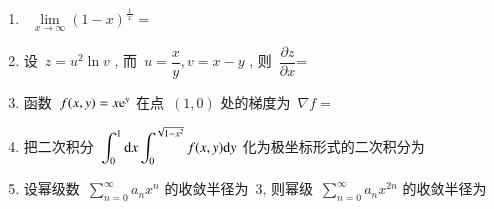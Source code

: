 \documentclass[twocolumn,landscape,fntef,UTF8]{ctexart}
\begin{document}
\begin{enumerate}%
\item ~$\lim\limits_{x\rightarrow \infty}(1-x)^{\frac{\,1\,}{x}}=$%
			
\item 设~$z = u^2\ln v$ , 而~$u= \dfrac{x}{y}, v = x-y$ , 则~$\dfrac{\partial z}{\partial x}$=%
			
\item 函数~$f(x,y) = x\mathrm{e}^y$ 在点~$(1,0)$ 处的梯度为~$\nabla f = $
			
\item 把二次积分~$\displaystyle{\int_0^1 \mathrm{d}x \int_0^{\sqrt{1-x^2}} f(x,y) \mathrm{d}y}$ 化为极坐标形式的二次积分为\\

\item 设幂级数~$\sum\limits_{n=0}^\infty a_nx^n$ 的收敛半径为~$3$, 则幂级~$\sum\limits_{n=0}^\infty a_nx^{2n}$ 的收敛半径为
\end{enumerate}
		
\newpage
\putzdx %
		
\end{document}
